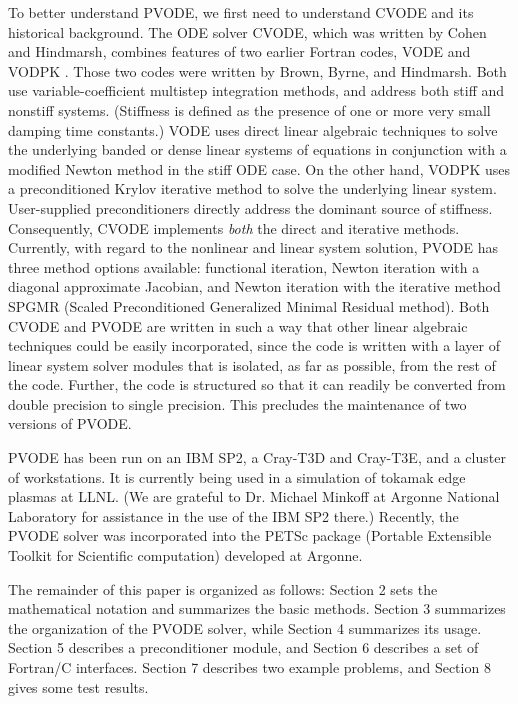 To better understand PVODE, we first need to understand CVODE and its
historical background. The ODE solver CVODE, which was written by
Cohen and Hindmarsh, combines features of two earlier Fortran codes,
VODE \cite{VODE} and VODPK \cite{VODPK}. Those two codes were
written by Brown, Byrne, and Hindmarsh.  Both use variable-coefficient
multistep integration methods, and address both stiff and nonstiff
systems.  (Stiffness is defined as the presence of one or more very
small damping time constants.)  VODE uses direct linear algebraic
techniques to solve the underlying banded or dense linear systems of
equations in conjunction with a modified Newton method in the stiff
ODE case. On the other hand, VODPK uses a preconditioned Krylov
iterative method \cite{Red-stor} to solve the underlying linear
system. User-supplied preconditioners directly address the dominant
source of stiffness. Consequently, CVODE implements {\it both} the
direct and iterative methods. Currently, with regard to the nonlinear
and linear system solution, PVODE has three method options available:
functional iteration, Newton iteration with a diagonal approximate
Jacobian, and Newton iteration with the iterative method SPGMR (Scaled
Preconditioned Generalized Minimal Residual method). Both CVODE and
PVODE are written in such a way that other linear algebraic techniques
could be easily incorporated, since the code is written with a layer
of linear system solver modules that is isolated, as far as possible,
from the rest of the code. Further, the code is structured so that it
can readily be converted from double precision to single
precision. This precludes the maintenance of two versions of PVODE.

PVODE has been run on an IBM SP2, a Cray-T3D and Cray-T3E, and a
cluster of workstations.  It is currently being used in a simulation
of tokamak edge plasmas at LLNL.  (We are grateful to Dr. Michael
Minkoff at Argonne National Laboratory for assistance in the use of
the IBM SP2 there.)  Recently, the PVODE solver was incorporated into
the PETSc package (Portable Extensible Toolkit for Scientific computation)
\cite{PETSc} developed at Argonne.

The remainder of this paper is organized as follows: Section 2 sets
the mathematical notation and summarizes the basic methods. Section 3
summarizes the organization of the PVODE solver, while Section 4
summarizes its usage.  Section 5 describes a preconditioner module,
and Section 6 describes a set of Fortran/C interfaces. Section 7
describes two example problems, and Section 8 gives some test results.


